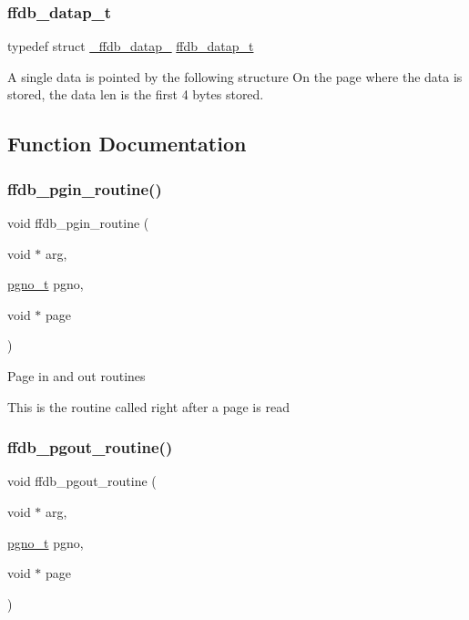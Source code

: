 \subsubsection{\texorpdfstring{ffdb\_datap\_t}{ffdb\_datap\_t}}
{\footnotesize\ttfamily typedef struct \mbox{\hyperlink{struct__ffdb__datap__}{\+\_\+ffdb\+\_\+datap\+\_\+}} \mbox{\hyperlink{adat-devel_2other__libs_2filedb_2filehash_2ffdb__page_8h_af1593018f0ec0e6539abbf3de31870e6}{ffdb\+\_\+datap\+\_\+t}}}

A single data is pointed by the following structure On the page where the data is stored, the data len is the first 4 bytes stored. 

\subsection{Function Documentation}
\mbox{\label{adat-devel_2other__libs_2filedb_2filehash_2ffdb__page_8h_a1af7c7a984e68481194b1457fc9e2165}} 
\subsubsection{\texorpdfstring{ffdb\_pgin\_routine()}{ffdb\_pgin\_routine()}}
{\footnotesize\ttfamily void ffdb\+\_\+pgin\+\_\+routine (\begin{DoxyParamCaption}\item[{void $\ast$}]{arg,  }\item[{\mbox{\hyperlink{adat-devel_2other__libs_2filedb_2filehash_2ffdb__db_8h_a000813331643d38481142bcce7de1501}{pgno\+\_\+t}}}]{pgno,  }\item[{void $\ast$}]{page }\end{DoxyParamCaption})}

Page in and out routines

This is the routine called right after a page is read \mbox{\label{adat-devel_2other__libs_2filedb_2filehash_2ffdb__page_8h_a29e873047c5bbb8214d85f3061c2b48c}} 
\subsubsection{\texorpdfstring{ffdb\_pgout\_routine()}{ffdb\_pgout\_routine()}}
{\footnotesize\ttfamily void ffdb\+\_\+pgout\+\_\+routine (\begin{DoxyParamCaption}\item[{void $\ast$}]{arg,  }\item[{\mbox{\hyperlink{adat-devel_2other__libs_2filedb_2filehash_2ffdb__db_8h_a000813331643d38481142bcce7de1501}{pgno\+\_\+t}}}]{pgno,  }\item[{void $\ast$}]{page }\end{DoxyParamCaption})}

